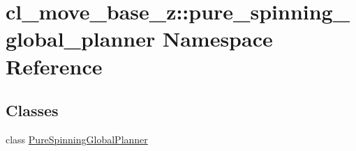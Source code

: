 \hypertarget{namespacecl__move__base__z_1_1pure__spinning__global__planner}{}\section{cl\+\_\+move\+\_\+base\+\_\+z\+:\+:pure\+\_\+spinning\+\_\+global\+\_\+planner Namespace Reference}
\label{namespacecl__move__base__z_1_1pure__spinning__global__planner}
\subsection*{Classes}
\begin{DoxyCompactItemize}
\item 
class \hyperlink{classcl__move__base__z_1_1pure__spinning__global__planner_1_1PureSpinningGlobalPlanner}{Pure\+Spinning\+Global\+Planner}
\end{DoxyCompactItemize}
